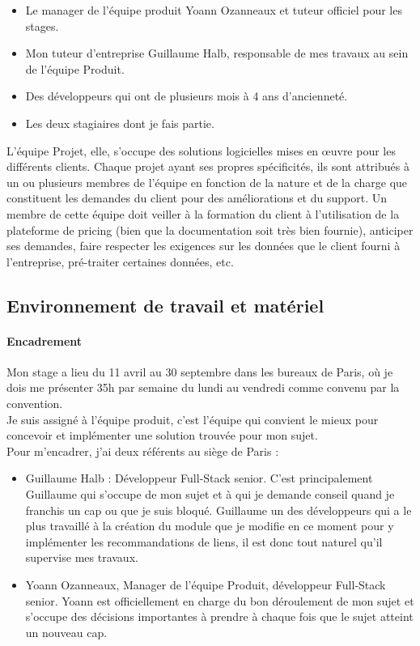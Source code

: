 \documentclass{rapportCS}
\begin{document}
\begin{itemize}
\item{Le manager de l'équipe produit Yoann Ozanneaux et tuteur officiel pour les stages.}
\item{Mon tuteur d'entreprise Guillaume Halb, responsable de mes travaux au sein de l'équipe Produit.}
\item{Des développeurs qui ont de plusieurs mois à 4 ans d'ancienneté.}
\item{Les deux stagiaires dont je fais partie.}
\end{itemize}

L'équipe Projet, elle, s'occupe des solutions logicielles mises en œuvre pour les différents clients.
Chaque projet ayant ses propres spécificités, ils sont attribués à un ou plusieurs membres
de l'équipe en fonction de la nature et de la charge que constituent les demandes du 
client pour des améliorations et du support. Un membre de cette équipe doit veiller à la formation
du client à l'utilisation de la plateforme de pricing (bien que la documentation soit très bien fournie),
anticiper ses demandes, faire respecter les exigences sur les données que le client fourni à l'entreprise,
pré-traiter certaines données, etc.

\subsection{Environnement de travail et matériel}
\paragraph{Encadrement} Mon stage a lieu du 11 avril au 30 septembre dans les bureaux de Paris, 
où je dois me présenter 35h par semaine du lundi au vendredi comme convenu par la convention.\\

Je suis assigné à l'équipe produit, c'est l'équipe qui convient le mieux pour concevoir et 
implémenter une solution trouvée pour mon sujet.\\
Pour m'encadrer, j'ai deux référents au siège de Paris :\\
\begin{itemize}
  \item Guillaume Halb : Développeur Full-Stack senior.
  C'est principalement Guillaume qui s'occupe de mon sujet et à qui je demande conseil 
  quand je franchis un cap ou que je suis bloqué.
  Guillaume un des développeurs qui a le plus travaillé à la création du module 
  que je modifie en ce moment pour y implémenter les recommandations de liens, il est donc tout naturel qu'il
  supervise mes travaux.
  \item Yoann Ozanneaux, Manager de l'équipe Produit, développeur Full-Stack senior.
  Yoann est officiellement en charge du bon déroulement de mon sujet et s'occupe des décisions importantes
  à prendre à chaque fois que le sujet atteint un nouveau cap.
\end{itemize}
\end{document}
